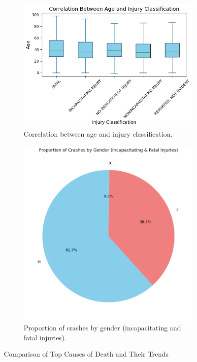 \documentclass[a4paper,12pt]{article}
\begin{document}
\begin{figure}[ht!]
	\centering
	\begin{subfigure}[t]{0.48\textwidth}
		\centering
		\includegraphics[width=\textwidth]{images/age-injury-classification.png} %
    \caption{Correlation between age and injury classification.}
    \label{fig:3.2}
	\end{subfigure}
	\hfill
	\begin{subfigure}[t]{0.48\textwidth}
		\centering
		\includegraphics[width=\textwidth]{images/crashes-by-gender.png} %
    \caption{Proportion of crashes by gender (incapacitating and fatal injuries).}
    \label{fig:3.3}
    \end{subfigure}
	\caption{Comparison of Top Causes of Death and Their Trends}
\end{figure}
\end{document}
